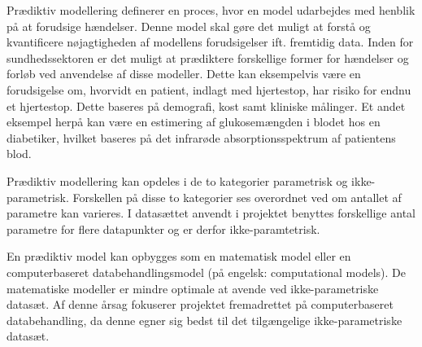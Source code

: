 \noindent
Prædiktiv modellering definerer en proces, hvor en model udarbejdes med henblik på at forudsige hændelser. Denne model skal gøre det muligt at forstå og kvantificere nøjagtigheden af modellens forudsigelser ift. fremtidig data.\cite{Kuhn2013} 
Inden for sundhedssektoren er det muligt at prædiktere forskellige former for hændelser og forløb ved anvendelse af disse modeller. Dette kan eksempelvis være en forudsigelse om, hvorvidt en patient, indlagt med hjertestop, har risiko for endnu et hjertestop. Dette baseres på demografi, kost samt kliniske målinger. Et andet eksempel herpå kan være en estimering af glukosemængden i blodet hos en diabetiker, hvilket baseres på det infrarøde absorptionsspektrum af patientens blod.\cite{Hastie2008}

\noindent
Prædiktiv modellering kan opdeles i de to kategorier parametrisk og ikke-parametrisk. Forskellen på disse to kategorier ses overordnet ved om antallet af parametre kan varieres. I datasættet anvendt i projektet benyttes forskellige antal parametre for flere datapunkter og er derfor ikke-paramtetrisk.\cite{Sheskin2000}

\noindent
En prædiktiv model kan opbygges som en matematisk model eller en computerbaseret databehandlingsmodel (på engelsk: computational models). De matematiske modeller er mindre optimale at avende ved ikke-parametriske datasæt. Af denne årsag fokuserer projektet fremadrettet på computerbaseret databehandling, da denne egner sig bedst til det tilgængelige ikke-parametriske datasæt. \cite{Sheskin2000} 
